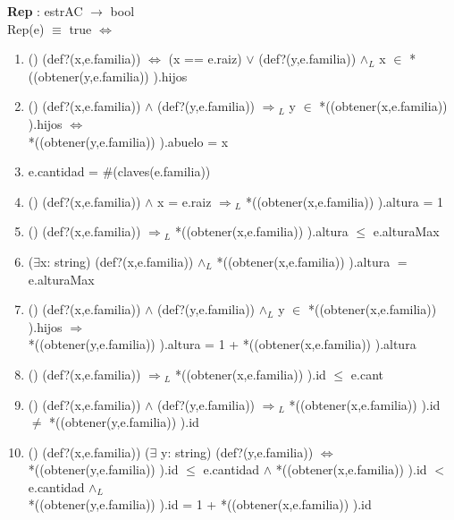 \documentclass[10pt, a4paper]{article}
\begin{document}
	
	   \textbf{Rep} : estrAC $\longrightarrow$ bool\\
	        Rep(e) $\equiv$ true $\Longleftrightarrow$\\
	
	   \begin{enumerate}

	   \item() (def?(x,e.familia)) $\Longleftrightarrow$ (x == e.raiz) $\vee$ (def?(y,e.familia)) $\wedge{_L}$ x $\in$ *((obtener(y,e.familia)) ).hijos
	       
	    \item () (def?(x,e.familia)) $\wedge$ (def?(y,e.familia)) $\Rightarrow{_L}$ y $\in$ *((obtener(x,e.familia)) ).hijos $\Leftrightarrow$ \\ *((obtener(y,e.familia)) ).abuelo = x

	    \item e.cantidad  = $\#$(claves(e.familia))  
	    
	    \item () (def?(x,e.familia)) $\wedge$ x = e.raiz $\Rightarrow{_L}$ *((obtener(x,e.familia)) ).altura = 1
	    
	    \item () (def?(x,e.familia)) $\Rightarrow{_L}$ *((obtener(x,e.familia)) ).altura $\leq$ e.alturaMax
	    
	    \item ($\exists$x: string) (def?(x,e.familia)) $\wedge{_L}$ *((obtener(x,e.familia)) ).altura $=$ e.alturaMax
	    
	    \item () (def?(x,e.familia)) $\wedge$ (def?(y,e.familia)) $\wedge{_L}$ y $\in$ *((obtener(x,e.familia)) ).hijos $\Rightarrow$ \\ *((obtener(y,e.familia)) ).altura = 1 + *((obtener(x,e.familia)) ).altura
	    
	    \item () (def?(x,e.familia)) $\Rightarrow{_L}$ *((obtener(x,e.familia)) ).id $\leq$ e.cant
	    
	    \item () (def?(x,e.familia)) $\wedge$ (def?(y,e.familia)) $\Rightarrow{_L}$ *((obtener(x,e.familia)) ).id $\neq$ *((obtener(y,e.familia)) ).id
	    
	    \item () (def?(x,e.familia)) ($\exists$ y: string) (def?(y,e.familia)) $\Leftrightarrow$ \\ *((obtener(y,e.familia)) ).id $\leq$ e.cantidad $\wedge$ *((obtener(x,e.familia)) ).id $<$ e.cantidad $\wedge{_L}$ \\*((obtener(y,e.familia)) ).id = 1 + *((obtener(x,e.familia)) ).id
	    
\end{enumerate}
\end{document}

